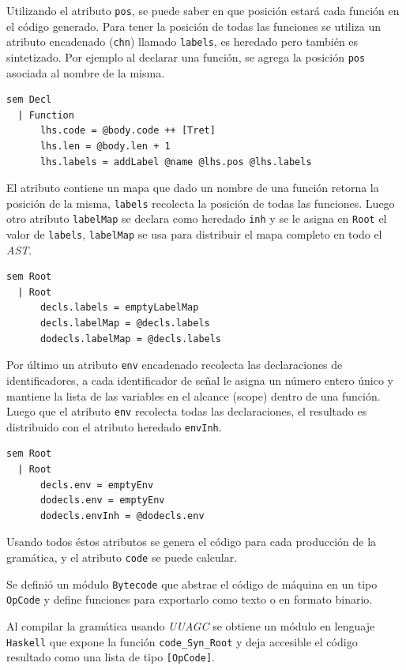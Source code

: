   Utilizando el atributo \texttt{pos}, se puede saber en que posición
  estará cada función en el código generado.
  Para tener la posición de todas las funciones se utiliza un atributo
  encadenado (\texttt{chn}) llamado \texttt{labels},
  es heredado pero también es sintetizado.
  Por ejemplo al declarar una función, se agrega la posición \texttt{pos}
  asociada al nombre de la misma.

\begin{Verbatim}
sem Decl
  | Function
      lhs.code = @body.code ++ [Tret]
      lhs.len = @body.len + 1
      lhs.labels = addLabel @name @lhs.pos @lhs.labels
\end{Verbatim}

  El atributo contiene un mapa que dado un nombre de una función retorna
  la posición de la misma, \texttt{labels} recolecta la posición de todas
  las funciones.
  Luego otro atributo \texttt{labelMap} se declara como heredado \texttt{inh}
  y se le asigna en \texttt{Root} el valor de \texttt{labels},
  \texttt{labelMap} se usa para distribuir el mapa
  completo en todo el \textit{AST}.

\begin{Verbatim}
sem Root
  | Root
      decls.labels = emptyLabelMap
      decls.labelMap = @decls.labels
      dodecls.labelMap = @decls.labels
\end{Verbatim}

  Por último un atributo \texttt{env} encadenado recolecta las declaraciones
  de identificadores, a cada identificador de señal le asigna un número
  entero único y mantiene la lista de las variables en el alcance (scope)
  dentro de una función. 
  Luego que el atributo \texttt{env} recolecta todas las declaraciones,
  el resultado es distribuido con el atributo heredado \texttt{envInh}.

\begin{Verbatim}
sem Root
  | Root
      decls.env = emptyEnv
      dodecls.env = emptyEnv
      dodecls.envInh = @dodecls.env
\end{Verbatim}

  Usando todos éstos atributos se genera el código para cada producción
  de la gramática, y el atributo \texttt{code} se puede calcular.

  Se definió un módulo \texttt{Bytecode} que abstrae el código
  de máquina en un tipo \texttt{OpCode} y define funciones para 
  exportarlo como texto o en formato binario.


  Al compilar la gramática usando \textit{UUAGC} se obtiene un módulo
  en lenguaje \texttt{Haskell} que expone la función \texttt{code\_Syn\_Root}
  y deja accesible el código resultado como una lista de
  tipo \texttt{[OpCode]}.

